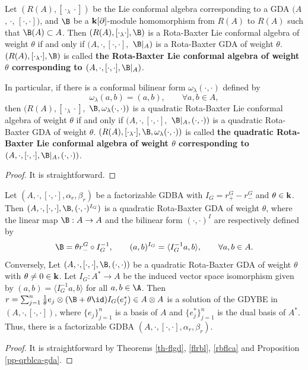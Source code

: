 \documentclass[12pt]{amsart}
\begin{document}
\begin{proposition}\label{pp-qrblca-gda}
Let $(R(A), [\cdot_\lambda \cdot])$ be the Lie conformal algebra
corresponding to a  GDA $(A$, $\cdot$, $[\cdot,\cdot])$, and $\B$
be a ${\bf k}[\partial]$-module homomorphism from $R(A)$ to $R(A)$
such that $\B(A)\subset A$. Then $(R(A), [\cdot_\lambda
\cdot],\B)$ is a   Rota-Baxter Lie conformal
algebra  of weight  $\theta$ if and only if $(A, \cdot, [\cdot,\cdot], $ $\B|_A )$ is a
Rota-Baxter GDA of weight  $\theta$. $(R(A), [\cdot_\lambda \cdot],
\B)$  is called {\bf the   Rota-Baxter Lie
conformal algebra of weight  $\theta$ corresponding to $(A, \cdot, [\cdot,\cdot],
\B|_A)$}.

In particular, if there is a conformal bilinear form
$\omega_\lambda(\cdot,\cdot)$ defined by
$$
\omega_\lambda(a,b)=(a,b),\qquad \forall a,b\in A,
$$
then $(R(A), [\cdot_\lambda \cdot],$
$\B,\omega_{\lambda}(\cdot,\cdot))$ is a quadratic
Rota-Baxter Lie conformal algebra of weight  $\theta$ if and only if
$(A, \cdot, [\cdot,\cdot], $ $\B|_A,(\cdot,\cdot) )$ is a
quadratic Rota-Baxter GDA of weight  $\theta$. $(R(A),
[\cdot_\lambda \cdot], \B,\omega_{\lambda}(\cdot,\cdot))$  is
called {\bf the quadratic   Rota-Baxter Lie
conformal algebra  of weight  $\theta$ corresponding to $(A, \cdot, [\cdot,\cdot],
\B|_A,(\cdot,\cdot))$}.
\end{proposition}

\begin{proof}
It is straightforward.
\end{proof}

\begin{theorem}\label{th-rbgd-fgd}
Let $(A,\cdot,[\cdot,\cdot],\alpha_r,\beta_r)$ be a factorizable GDBA with $I_G=r^G_+-r^G_-$ and $\theta\in {\bf k}$. Then $(A,\cdot,[\cdot,\cdot],\B,(\cdot,\cdot)^{I_G})$ is a quadratic Rota-Baxter GDA of weight
 $\theta$, where the linear map $\B:A\rightarrow A$ and the bilinear form $(\cdot,\cdot)^I$ are respectively defined  by
$$
\B=\theta r_-^G\circ I_{G}^{-1},\qquad (a,b)^{I_G}=\langle I_G^{-1}a, b\rangle, \qquad \forall a,b\in A.
$$
Conversely, Let $(A,\cdot,[\cdot,\cdot],\B,(\cdot,\cdot))$ be a quadratic Rota-Baxter GDA of weight  $\theta$ with $\theta\neq 0\in {\bf k}$.
Let $I_G: A^*\rightarrow A$ be the induced vector space isomorphism given by $(a,b)=\langle I_G^{-1} a,b\rangle $ for all $a,b \in \A$.
Then $r=\sum_{j=1}^n \frac{1}{\theta}e_j\otimes (\B+\theta\id)I_G(e_j^*)\in A\otimes A$ is a solution of the GDYBE in $(A,\cdot,[\cdot,\cdot])$, where $\{ e_j\}_{j=1}^n$ is a basis of $A$ and $\{e_j^*\}_{j=1}^n$ is the dual basis of $A^*$. Thus, there is a factorizable GDBA $(A,\cdot,[\cdot,\cdot],\alpha_r,\beta_r)$.
 
\end{theorem}
\begin{proof}


It is straightforward by Theorems \ref{th-flgd}, \ref{flrbl},  \ref{rbflca} and Proposition  \ref{pp-qrblca-gda}.
\end{proof}
\end{document}
